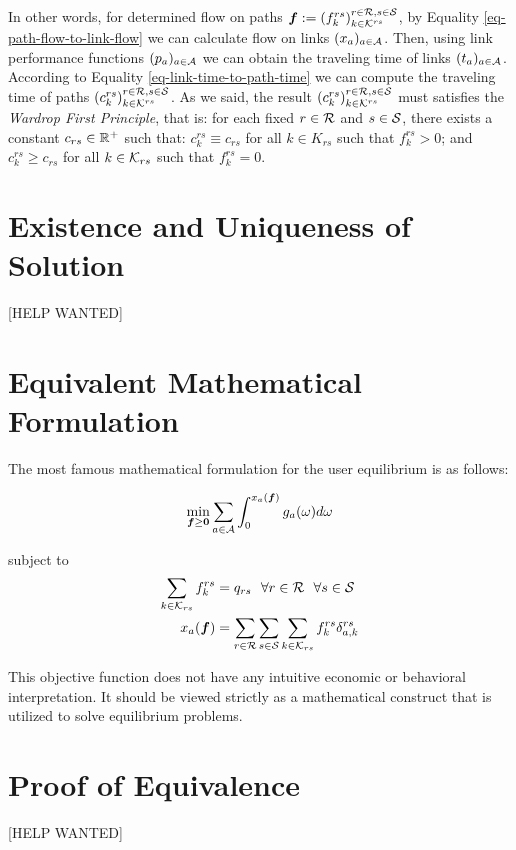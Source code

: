 \documentclass{article}
\begin{document}
In other words, for determined flow on paths $ \boldsymbol{f} := \left( f_k^{rs} \right)_{k \in \mathcal{K}^{rs}}^{r \in \mathcal{R}, s \in \mathcal{S}} $, by Equality \ref{eq-path-flow-to-link-flow} we can calculate flow on links $ (x_a)_{a \in \mathcal{A}} $. Then, using link performance functions $ (p_a)_{a \in \mathcal{A}} $ we can obtain the traveling time of links $ (t_a)_{a \in \mathcal{A}} $. According to Equality \ref{eq-link-time-to-path-time} we can compute the traveling time of paths $ \left( c_k^{rs} \right)_{k \in \mathcal{K}^{rs}}^{r \in \mathcal{R}, s \in \mathcal{S}} $. As we said, the result $ \left( c_k^{rs} \right)_{k \in \mathcal{K}^{rs}}^{r \in \mathcal{R}, s \in \mathcal{S}} $ must satisfies the \textit{Wardrop First Principle}, that is: for each fixed $ r \in \mathcal{R} $ and $ s \in \mathcal{S} $, there exists a constant $ c_{rs} \in \mathbb{R}^+ $ such that: $ c_k^{rs} \equiv c_{rs} $ for all $ k \in K_{rs} $ such that $ f_k^{rs} > 0 $; and $ c_k^{rs} \ge c_{rs} $ for all $ k \in \mathcal{K}_{rs} $ such that $ f_k^{rs} = 0 $. 

\section{Existence and Uniqueness of Solution}

[HELP WANTED]

\section{Equivalent Mathematical Formulation}

The most famous mathematical formulation for the user equilibrium is as follows: 

$$ \min_{\boldsymbol{f} \ge \boldsymbol{0}} \sum_{a \in \mathcal{A}} \int_0^{x_a (\boldsymbol{f})} g_a (\omega) d \omega $$

subject to
\begin{align*}
    \sum_{k \in \mathcal{K}_{rs}} f_{k}^{rs} &= q_{rs} ~~ \forall r \in \mathcal{R} ~~ \forall s \in \mathcal{S} \\
    x_a (\boldsymbol{f}) &= \sum_{r \in \mathcal{R}} \sum_{s \in \mathcal{S}} \sum_{k \in \mathcal{K}_{rs}} f_{k}^{rs} \delta_{a, k}^{rs}
\end{align*}

This objective function does not have any intuitive economic or behavioral interpretation. It should be viewed strictly as a mathematical construct that is utilized to solve equilibrium problems. \cite{Shef85}

\section{Proof of Equivalence}

[HELP WANTED]

\printbibliography
\end{document}

